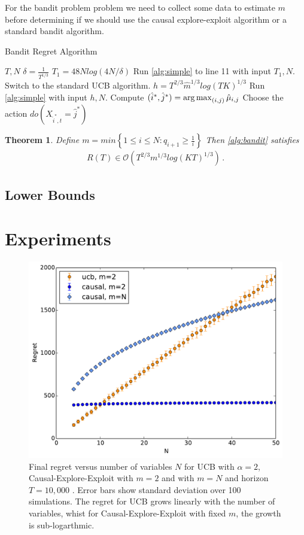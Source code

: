 \documentclass{article}
\newcommand{\set}[1]{\left\{#1\right\}}
\newcommand{\argmax}{\operatornamewithlimits{arg\,max}}
\newcommand{\eq}[1]{\begin{align*}#1\end{align*}}
\newcommand{\bigo}[1]{\mathcal{O}\left( #1 \right)}
\theoremstyle{plain}
\newtheorem{theorem}{Theorem}
\theoremstyle{definition}
\begin{document}
For the bandit problem problem we need to collect some data to estimate $m$ before determining if we should use the causal explore-exploit algorithm or a standard bandit algorithm. 


\begin{algorithm}[h]
\caption{Bandit Regret Algorithm}\label{alg:bandit}
\begin{algorithmic}[1]
 $T, N$
\STATE $\delta = \frac{1}{T^{1/3}}$ 
\STATE $T_1 = 48Nlog\left(4N/\delta\right)$ 
\STATE Run \cref{alg:simple} to line 11 with input $T_1,N$.
\STATE Switch to the standard UCB algorithm.
\ELSE
\STATE $h = T^{2/3}\hat{m}^{1/3}log(TK)^{1/3}$ 
\STATE Run \cref{alg:simple} with input $h,N$.
\STATE Compute $(\hat{i}^*,\hat{j}^*) = \argmax_{(i,j)} \hat{\mu}_{i,j}$
\STATE Choose the action $do(X_{\hat{i}^*,t} = \hat{j}^*)$
\ENDFOR
\ENDIF
\end{algorithmic}
\end{algorithm}

\begin{theorem}\label{thm:unknown_q_regret}
Define $m =   min\set{1 \leq i \leq N:q_{i+1} \geq \frac{1}{i}}$
Then \cref{alg:bandit} satisfies
\eq{
R(T) \in \bigo{T^{2/3}m^{1/3}log(KT)^{1/3}}\,.
}
\end{theorem}

\subsection{Lower Bounds}

\section{Experiments}

\begin{figure}
\caption{Final regret versus number of variables $N$ for UCB with $\alpha = 2$, Causal-Explore-Exploit with $m=2$ and with $m=N$ and horizon $T = 10,000$ . Error bars show standard deviation over 100 simulations. The regret for UCB grows linearly with the number of variables, whist for Causal-Explore-Exploit with fixed $m$, the growth is sub-logarthmic.  }
\label{fig:known_q_r_vs_N}
\centering
\includegraphics[width=.5\textwidth]{exp_regret_vs_N_T10000_sims100_20151229_113550.pdf}
\end{figure}
\end{document}
